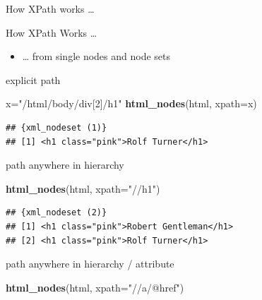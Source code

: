 \documentclass[ignorenonframetext,]{beamer}
\newenvironment{Shaded}{\begin{snugshade}}{\end{snugshade}}
\newcommand{\KeywordTok}[1]{\textcolor[rgb]{0.13,0.29,0.53}{\textbf{{#1}}}}
\newcommand{\DataTypeTok}[1]{\textcolor[rgb]{0.13,0.29,0.53}{{#1}}}
\newcommand{\StringTok}[1]{\textcolor[rgb]{0.31,0.60,0.02}{{#1}}}
\newcommand{\NormalTok}[1]{{#1}}
\providecommand{\tightlist}{%
  \setlength{\itemsep}{0pt}\setlength{\parskip}{0pt}}
\begin{document}
\begin{frame}[fragile]{How XPath works \ldots{}}
\begin{block}{How XPath Works \ldots{}}
\begin{itemize}
  \begin{itemize}
  \tightlist
  \item
    node values
  \item
    attribute values
  \end{itemize}
\item
  \ldots{} from single nodes and node sets
\end{itemize}

\end{block}

\begin{block}{explicit path}

\begin{Shaded}
\begin{Highlighting}[]
\NormalTok{x=}\StringTok{"/html/body/div[2]/h1"}
\KeywordTok{html_nodes}\NormalTok{(html, }\DataTypeTok{xpath=}\NormalTok{x)}
\end{Highlighting}
\end{Shaded}

\begin{verbatim}
## {xml_nodeset (1)}
## [1] <h1 class="pink">Rolf Turner</h1>
\end{verbatim}

\end{block}

\begin{block}{path anywhere in hierarchy}

\begin{Shaded}
\begin{Highlighting}[]
\KeywordTok{html_nodes}\NormalTok{(html, }\DataTypeTok{xpath=}\StringTok{"//h1"}\NormalTok{)}
\end{Highlighting}
\end{Shaded}

\begin{verbatim}
## {xml_nodeset (2)}
## [1] <h1 class="pink">Robert Gentleman</h1>
## [2] <h1 class="pink">Rolf Turner</h1>
\end{verbatim}

\end{block}

\begin{block}{path anywhere in hierarchy / attribute}

\begin{Shaded}
\begin{Highlighting}[]
\KeywordTok{html_nodes}\NormalTok{(html, }\DataTypeTok{xpath=}\StringTok{"//a/@href"}\NormalTok{)}
\end{Highlighting}
\end{Shaded}


\end{block}
\end{frame}
\end{document}

